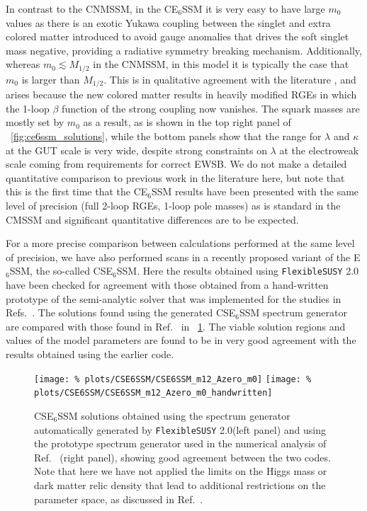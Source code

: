 \documentclass[final,3p,11pt,pdflatex]{elsarticle}
\makeatletter
\newcommand{\fs}{\texttt{FlexibleSUSY}\@\xspace}
\newcommand{\fstwo}{\fs 2.0\@\xspace}
\newcommand{\ESSM}{E$_6$SSM\@\xspace}
\newcommand{\figref}[1]{\figurename~\ref{#1}}
\newcommand{\mhalf}{\ensuremath{M_{1/2}}\xspace}
\newcommand{\mzero}{\ensuremath{m_0}\xspace}
\makeatother
\begin{document}
In contrast to the CNMSSM, in the C\ESSM it is very easy to have large
$\mzero$ values as there is an exotic Yukawa coupling between the singlet and
extra colored matter introduced to avoid gauge anomalies that drives the soft
singlet mass negative, providing a radiative symmetry breaking mechanism.
Additionally, whereas $\mzero \lesssim \mhalf$ in the CNMSSM, in this model
it is typically the case that $\mzero$ is larger than $\mhalf$.  This is
in qualitative agreement with the literature \cite{Athron:2009ue,
  Athron:2009bs,Athron:2012sq,Athron:2012pw}, and arises because the new
colored matter results in heavily modified RGEs in which the 1-loop
$\beta$ function of the strong coupling now vanishes.  The squark masses are
mostly set by $\mzero$ as a result, as is shown in the top right panel of
\figref{fig:ce6ssm_solutions}, while the bottom panels show that the range for
$\lambda$ and $\kappa$ at the GUT scale is very wide, despite strong
constraints on $\lambda$ at the electroweak scale coming from requirements for correct
EWSB\@.   We do not make a detailed quantitative comparison to previous work in
the literature here, but note that this is the first time that the C\ESSM
results have been presented with the same level of precision (full 2-loop RGEs,
1-loop pole masses) as is standard in the CMSSM and significant quantitative
differences are to be expected.

For a more precise comparison between calculations performed at the
same level of precision, we have also performed scans in a recently proposed
variant of the \ESSM, the so-called CS\ESSM \cite{Athron:2015vxg,
  Athron:2016gor}. Here the results obtained using \fstwo have been checked for
agreement with those obtained from a hand-written prototype of the
semi-analytic solver that was implemented for the studies in
Refs.~\cite{Athron:2015vxg,Athron:2016gor}.  The solutions found using the
generated CS\ESSM spectrum generator are compared with those found in
Ref.~\cite{Athron:2016gor} in \figref{fig:cse6ssm_m12_Azero_plane}.  The viable
solution regions and values of the model parameters are found to be in very
good agreement with the results obtained using the earlier code.
%
\begin{figure}[tbh]
  \centering
  \texttt{[image: \%
    plots/CSE6SSM/CSE6SSM\_m12\_Azero\_m0]}
  \texttt{[image: \%
    plots/CSE6SSM/CSE6SSM\_m12\_Azero\_m0\_handwritten]}
  \caption{CS\ESSM solutions obtained using the spectrum generator
    automatically generated by \fstwo (left panel) and using the prototype
    spectrum generator used in the numerical analysis of
    Ref.~\cite{Athron:2016gor} (right panel), showing good agreement between
    the two codes.  Note that here we have not applied the limits on the Higgs
    mass or dark matter relic density that lead to additional restrictions on
    the parameter space, as discussed in Ref.~\cite{Athron:2016gor}.}
  \label{fig:cse6ssm_m12_Azero_plane}
\end{figure}
\end{document}
